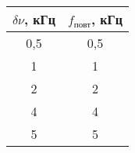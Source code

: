 \begin{tabular}{cc}
\toprule
$\delta \nu$, кГц & $f_\text{повт}$, кГц \\
\midrule
0,5	& 0,5 \\
1	& 1   \\
2	& 2   \\
4	& 4   \\
5	& 5   \\
\bottomrule
\end{tabular}